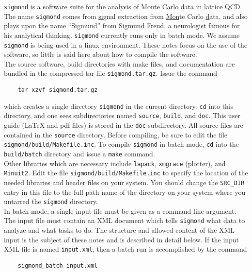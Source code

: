 \documentclass[12pt]{article}
\newcommand{\sigmond}{\texttt{sigmond} }
\newcommand{\vb}{\texttt}
\begin{document}
\sigmond is a software suite for the analysis of Monte Carlo data in
lattice QCD.  The name \texttt{sigmond} comes from \underline{sig}nal
extraction from \underline{Mon}te Carlo \underline{d}ata, and also plays
upon the name ``Sigmund'' from Sigmund Freud, a neurologist famous for
his analytical thinking.
\sigmond currently runs only in batch mode.
We assume \sigmond is being used
in a linux environment.  These notes focus on the use of the software,
so little is said here about how to compile the software.\\

The source software, build directories with make files, and documentation
are bundled in the compressed tar file \vb{sigmond.tar.gz}.  Issue the
command
\begin{verbatim}
    tar xzvf sigmond.tar.gz
\end{verbatim}
which creates a single directory \vb{sigmond} in the current directory.
\vb{cd} into this directory, and one sees subdirectories named \vb{source},
\vb{build}, and \vb{doc}.  This user guide (LaTeX and pdf files)
is stored in the \vb{doc} subdirectory.  All source files are contained in
the \vb{source} directory.   Before compiling, be sure to edit the file
\vb{sigmond/build/Makefile.inc}.  To compile \vb{sigmond} in batch mode,
\vb{cd} into the \vb{build/batch} directory and
issue a \vb{make} command. \\

Other libraries which are necessary include \vb{lapack}, \vb{xmgrace} (plotter),
and \vb{Minuit2}.
Edit the file
\vb{sigmond/build/Makefile.inc} to specify the location of the needed
libraries and header files on your system.  You should change the \vb{SRC\_DIR}
entry in this file to the full path name of the directory on your system
where you untarred the \vb{sigmond} directory.\\

In batch mode, a single input file must be given as a command line
argument.  The input file must contain an XML document which
tells \sigmond what data to analyze and what tasks to do.  The structure
and allowed content of the XML input is the subject of these notes and
is described in detail below.  If the input XML file is named
\vb{input.xml}, then a batch run is accomplished by the command
\begin{verbatim}
    sigmond_batch input.xml
\end{verbatim}
\end{document}
